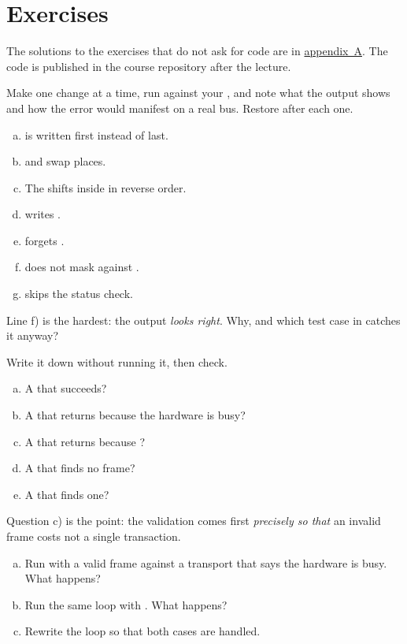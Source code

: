 \section*{Exercises}

The solutions to the exercises that do not ask for code are in
\hyperref[ch:losningar]{appendix~A}. The code is published in the course repository after the
lecture.

\label{ex:10:1}
Make one change at a time, run against your , and note what the output shows
and how the error would manifest on a real bus. Restore after each one.
\begin{enumerate}[a)]
  \item {} is written first instead of last.
  \item {} and  swap places.
  \item The shifts inside  in reverse order.
  \item {} writes .
  \item {} forgets .
  \item {} does not mask against .
  \item {} skips the status check.
\end{enumerate}
Line f) is the hardest: the output \emph{looks right}. Why, and which test case in
 catches it anyway?

\label{ex:10:2}
Write it down without running it, then check.
\begin{enumerate}[a)]
  \item A  that succeeds?
  \item A  that returns  because the hardware is busy?
  \item A  that returns  because ?
  \item A  that finds no frame?
  \item A  that finds one?
\end{enumerate}
Question c) is the point: the validation comes first \emph{precisely so that} an invalid frame
costs not a single transaction.

\label{ex:10:3}
\begin{enumerate}[a)]
  \item Run  with a valid frame against a transport that says
    the hardware is busy. What happens?
  \item Run the same loop with . What happens?
  \item Rewrite the loop so that both cases are handled.
\end{enumerate}

